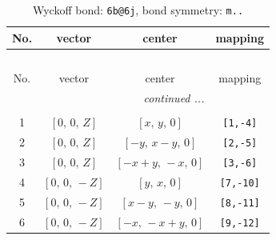 \documentclass[fleqn,8pt]{jsarticle}
\begin{document}
\begin{longtable}{cccc}
\caption{Wyckoff bond: {\tt 6b@6j}, bond symmetry: {\tt m..}}
 \\
 \hline \hline
No. & vector & center & mapping \\ \hline \endfirsthead

\multicolumn{3}{l}{\tablename\ \thetable{}} \\
 \hline \hline
No. & vector & center & mapping \\ \hline \endhead

 \hline \hline
\multicolumn{3}{r}{\footnotesize\it continued ...} \\ \endfoot

 \hline \hline
\multicolumn{3}{r}{} \\ \endlastfoot

1 & $\left[ 0,\, 0,\, Z \right]$ & $\left[ x,\, y,\, 0 \right]$ & {\tt [1,-4]} \\ \hline
2 & $\left[ 0,\, 0,\, Z \right]$ & $\left[ - y,\, x - y,\, 0 \right]$ & {\tt [2,-5]} \\ \hline
3 & $\left[ 0,\, 0,\, Z \right]$ & $\left[ - x + y,\, - x,\, 0 \right]$ & {\tt [3,-6]} \\ \hline
4 & $\left[ 0,\, 0,\, - Z \right]$ & $\left[ y,\, x,\, 0 \right]$ & {\tt [7,-10]} \\ \hline
5 & $\left[ 0,\, 0,\, - Z \right]$ & $\left[ x - y,\, - y,\, 0 \right]$ & {\tt [8,-11]} \\ \hline
6 & $\left[ 0,\, 0,\, - Z \right]$ & $\left[ - x,\, - x + y,\, 0 \right]$ & {\tt [9,-12]} \\
\end{longtable}
\renewcommand{\arraystretch}{1.2}
\end{document}
